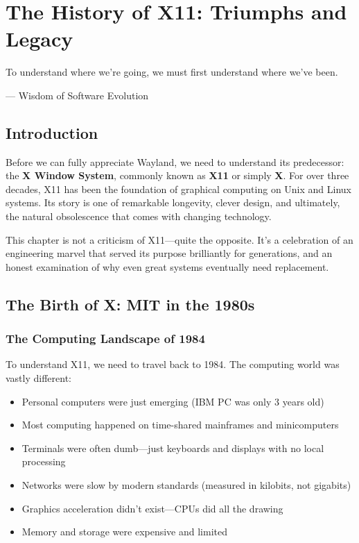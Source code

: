 \chapter{The History of X11: Triumphs and Legacy}
\label{ch:history-x11}

\epigraph{To understand where we're going, we must first understand where we've been.}{--- Wisdom of Software Evolution}

\section{Introduction}

Before we can fully appreciate Wayland, we need to understand its predecessor: the \textbf{X Window System}, commonly known as \textbf{X11} or simply \textbf{X}. For over three decades, X11 has been the foundation of graphical computing on Unix and Linux systems. Its story is one of remarkable longevity, clever design, and ultimately, the natural obsolescence that comes with changing technology.

This chapter is not a criticism of X11—quite the opposite. It's a celebration of an engineering marvel that served its purpose brilliantly for generations, and an honest examination of why even great systems eventually need replacement.

\section{The Birth of X: MIT in the 1980s}

\subsection{The Computing Landscape of 1984}

To understand X11, we need to travel back to 1984. The computing world was vastly different:

\begin{itemize}[leftmargin=*]
    \item Personal computers were just emerging (IBM PC was only 3 years old)
    \item Most computing happened on time-shared mainframes and minicomputers
    \item Terminals were often dumb—just keyboards and displays with no local processing
    \item Networks were slow by modern standards (measured in kilobits, not gigabits)
    \item Graphics acceleration didn't exist—CPUs did all the drawing
    \item Memory and storage were expensive and limited
\end{itemize}

